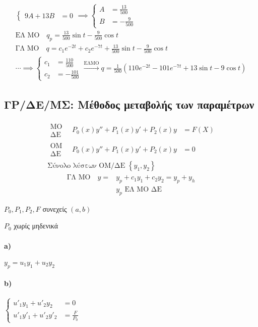 \documentclass[11pt,a4paper,titlepage,draft]{article}
\begin{document}
\begin{exercise*}{5.36}
\begin{gather*}
\begin{cases}
		9A+13B&=0
		\end{cases} \implies \begin{cases}
		A &= \frac{13}{500} \\
		B &= -\frac{9}{500}
		\end{cases}
		\\
		\text{ΕΛ ΜΟ} \quad q_p = \frac{13}{500}\sin t -\frac{9}{500}\cos t\\
		\text{ΓΛ ΜΟ} \quad q = c_1e^{-2t}+c_2e^{-7t}+\frac{13}{500}\sin t - \frac{9}{500}\cos t\\
		\cdots \implies \begin{cases}
		c_1 &= \frac{110}{500} \\
		c_2 &= -\frac{101}{500}
		\end{cases} \xrightarrow{\text{ΕΛΜΟ}} q = \frac{1}{500} (110e^{-2t}-101e^{-7t}+13\sin t-9\cos t)
	\end{gather*}
\end{exercise*}

\subsection{ΓΡ/ΔΕ/ΜΣ: Μέθοδος μεταβολής των παραμέτρων}
\begin{align*}
\begin{matrix}
\text{ΜΟ}\\\text{ΔΕ}\end{matrix}\quad P_0(x)y'' + P_1(x)y'+P_2(x)y &= F(X) \\
\begin{matrix}
\text{ΟΜ}\\\text{ΔΕ}\end{matrix}\quad P_0(x)y'' + P_1(x)y'+P_2(x)y &=0 \\
\text{Σύνολο λύσεων ΟΜ/ΔΕ } \left\lbrace y_1,y_2 \right\rbrace &
\end{align*}
\begin{align*}
\text{ΓΛ ΜΟ}\quad y = & y_p + c_1y_1+c_2y_2=y_p+y_h\\
& y_p \text{ ΕΛ ΜΟ ΔΕ}
\end{align*}

\(P_0,P_1,P_2,F\) συνεχείς \((a,b)\)

\(P_0 \) χωρίς μηδενικά

\paragraph{\textlatin{a})}
\(
y_p = u_1y_1+u_2y_2
\)

\paragraph{\textlatin{b})}
\(
\begin{cases}
u'_1y_1+u'_2y_2 &=0\\
u'_1y'_1+u'_2y'_2 &= \frac{F}{P_0}
\end{cases}
\)
\end{document}
